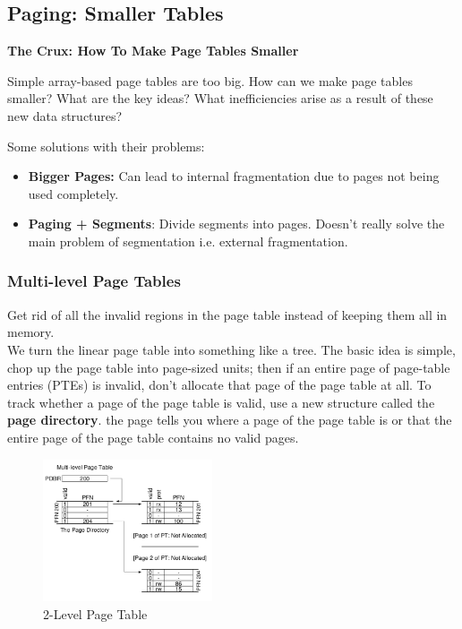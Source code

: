 \subsection{Paging: Smaller Tables}

\begin{tcolorbox}
    \begin{center}
        \textbf{The Crux: How To Make Page Tables Smaller}
    \end{center}

    Simple array-based page tables are too big. How can we make page tables
    smaller? What are the key ideas? What inefficiencies arise as a result of
    these new data structures?
\end{tcolorbox}

Some solutions with their problems:

\begin{itemize}
    \item \textbf{Bigger Pages:} Can lead to internal fragmentation due to
        pages not being used completely.
    \item \textbf{Paging + Segments}: Divide segments into pages. Doesn't really
        solve the main problem of segmentation i.e. external fragmentation.
\end{itemize}

\subsubsection{Multi-level Page Tables}

Get rid of all the invalid regions in the page table instead of keeping them
all in memory.\\

We turn the linear page table into something like a tree. The basic idea is 
simple, chop up the page table into page-sized units; then if an entire page of
page-table entries (PTEs) is invalid, don't allocate that page of the page table
at all. To track whether a page of the page table is valid, use a new structure
called the \textbf{page directory}. the page tells you where a page of the
page table is or that the entire page of the page table contains no
valid pages.

\begin{figure}[h!]
    \begin{center}
        \includegraphics[width=5cm]{img/203.png}
        \caption{2-Level Page Table}
    \end{center}
\end{figure}


